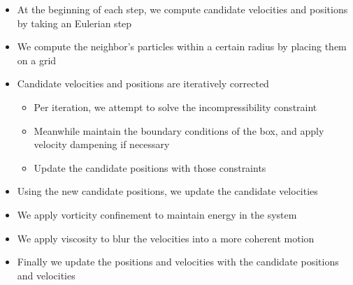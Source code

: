 \documentclass{scrartcl}
\begin{document}
        \begin{itemize}
        	\item At the beginning of each step, we compute candidate velocities and positions by taking an Eulerian step
        	\item We compute the neighbor's particles within a certain radius by placing them on a grid
        	\item Candidate velocities and positions are iteratively corrected
        	\begin{itemize}
        		\item Per iteration, we attempt to solve the incompressibility constraint
        		\item Meanwhile maintain the boundary conditions of the box, and apply velocity dampening if necessary
        		\item Update the candidate positions with those constraints
        	\end{itemize}
        	\item Using the new candidate positions, we update the candidate velocities
        	\item We apply vorticity confinement to maintain energy in the system
        	\item We apply viscosity to blur the velocities into a more coherent motion
        	\item Finally we update the positions and velocities with the candidate positions and velocities
        \end{itemize}
    
        
        
\end{document}
